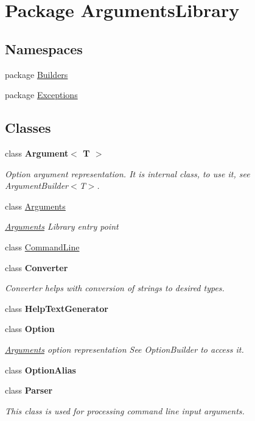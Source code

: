 \hypertarget{namespace_arguments_library}{\section{Package Arguments\+Library}
\label{namespace_arguments_library}
}
\subsection*{Namespaces}
\begin{DoxyCompactItemize}
\item 
package \hyperlink{namespace_arguments_library_1_1_builders}{Builders}
\item 
package \hyperlink{namespace_arguments_library_1_1_exceptions}{Exceptions}
\end{DoxyCompactItemize}
\subsection*{Classes}
\begin{DoxyCompactItemize}
\item 
class {\bfseries Argument$<$ T $>$}
\begin{DoxyCompactList}\small\item\em Option argument representation. It is internal class, to use it, see Argument\+Builder$<$\+T$>$.  \end{DoxyCompactList}\item 
class \hyperlink{class_arguments_library_1_1_arguments}{Arguments}
\begin{DoxyCompactList}\small\item\em \hyperlink{class_arguments_library_1_1_arguments}{Arguments} Library entry point \end{DoxyCompactList}\item 
class \hyperlink{class_arguments_library_1_1_command_line}{Command\+Line}
\item 
class {\bfseries Converter}
\begin{DoxyCompactList}\small\item\em Converter helps with conversion of strings to desired types. \end{DoxyCompactList}\item 
class {\bfseries Help\+Text\+Generator}
\item 
class {\bfseries Option}
\begin{DoxyCompactList}\small\item\em \hyperlink{class_arguments_library_1_1_arguments}{Arguments} option representation See Option\+Builder to access it.  \end{DoxyCompactList}\item 
class {\bfseries Option\+Alias}
\item 
class {\bfseries Parser}
\begin{DoxyCompactList}\small\item\em This class is used for processing command line input arguments. \end{DoxyCompactList}\end{DoxyCompactItemize}
